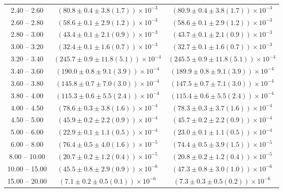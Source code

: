 \begin{table}
\begin{center}
\begin{tabular}{ c | c c }
2.40 -- 2.60 & $(80.8\pm0.4\pm3.8(1.7))\times10^{-3}$ & $(80.9\pm0.4\pm3.8(1.7))\times10^{-3}$ \\ 
2.60 -- 2.80 & $(58.6\pm0.1\pm2.9(1.2))\times10^{-3}$ & $(58.6\pm0.1\pm2.9(1.2))\times10^{-3}$ \\ 
2.80 -- 3.00 & $(43.4\pm0.1\pm2.1(0.9))\times10^{-3}$ & $(43.7\pm0.1\pm2.1(0.9))\times10^{-3}$ \\ 
3.00 -- 3.20 & $(32.4\pm0.1\pm1.6(0.7))\times10^{-3}$ & $(32.7\pm0.1\pm1.6(0.7))\times10^{-3}$ \\ 
3.20 -- 3.40 & $(245.7\pm0.9\pm11.8(5.1))\times10^{-4}$ & $(245.5\pm0.9\pm11.8(5.1))\times10^{-4}$ \\ 
3.40 -- 3.60 & $(190.0\pm0.8\pm9.1(3.9))\times10^{-4}$ & $(189.9\pm0.8\pm9.1(3.9))\times10^{-4}$ \\ 
3.60 -- 3.80 & $(145.8\pm0.7\pm7.0(3.0))\times10^{-4}$ & $(147.5\pm0.7\pm7.1(3.0))\times10^{-4}$ \\ 
3.80 -- 4.00 & $(115.3\pm0.6\pm5.5(2.4))\times10^{-4}$ & $(115.4\pm0.6\pm5.5(2.4))\times10^{-4}$ \\ 
4.00 -- 4.50 & $(78.6\pm0.3\pm3.8(1.6))\times10^{-4}$ & $(78.3\pm0.3\pm3.7(1.6))\times10^{-4}$ \\ 
4.50 -- 5.00 & $(45.9\pm0.2\pm2.2(0.9))\times10^{-4}$ & $(45.7\pm0.2\pm2.2(0.9))\times10^{-4}$ \\ 
5.00 -- 6.00 & $(22.9\pm0.1\pm1.1(0.5))\times10^{-4}$ & $(23.0\pm0.1\pm1.1(0.5))\times10^{-4}$ \\ 
6.00 -- 8.00 & $(76.4\pm0.5\pm4.0(1.6))\times10^{-5}$ & $(74.4\pm0.5\pm3.9(1.5))\times10^{-5}$ \\ 
8.00 -- 10.00 & $(20.7\pm0.2\pm1.2(0.4))\times10^{-5}$ & $(20.8\pm0.2\pm1.2(0.4))\times10^{-5}$ \\ 
10.00 -- 15.00 & $(45.5\pm0.8\pm2.9(0.9))\times10^{-6}$ & $(47.3\pm0.8\pm3.0(1.0))\times10^{-6}$ \\ 
15.00 -- 20.00 & $(7.1\pm0.2\pm0.5(0.1))\times10^{-6}$ & $(7.3\pm0.3\pm0.5(0.2))\times10^{-6}$ \\ 
\hline
\end{tabular}
\end{center}
\end{table}
 
